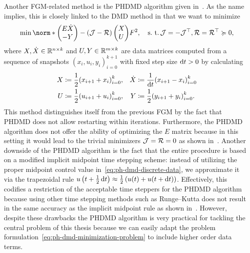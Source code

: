 Another \ac{FGM}-related method is the \ac{PHDMD} algorithm given in~\cite{Morandin2023}.
As the name implies, this is closely linked to the \ac{DMD} method in that we want to minimize
\begin{equation}\label{eq:ph-dmd-minimization-problem}
    \min \norm*{\begin{pmatrix}
        E \dot{X} \\
        -Y
    \end{pmatrix} - (\mcl{J} - \mcl{R}) \begin{pmatrix}
        X \\
        U
    \end{pmatrix}}{F}^2,\quad \suchthat \mcl{J} = - \mcl{J}\trans, \mcl{R} = \mcl{R}\trans \succcurlyeq 0,
\end{equation}
where $X, \dot{X} \in \mathbb{R}^{n \times k}$ and $U, Y \in \mathbb{R}^{m \times k}$ are data matrices computed from a sequence of snapshots ${(x_i, u_i, y_i)}_{i = 0}^{k + 1}$ with fixed step size $\mathop{}\!\mathrm{d} t > 0$ by calculating
\begin{equation}\label{eq:ph-dmd-discrete-data}
    \begin{alignedat}{3}
        X &\coloneqq \frac{1}{2} {\left( x_{i + 1} + x_i \right)}_{i = 0}^k,\quad &\dot{X} &\coloneqq \frac{1}{\mathop{}\!\mathrm{d} t} {\left( x_{i + 1} - x_i \right)}_{i = 0}^k \\
        U &\coloneqq \frac{1}{2} {\left( u_{i + 1} + u_i \right)}_{i = 0}^k,\quad &Y &\coloneqq \frac{1}{2} {\left( y_{i + 1} + y_i \right)}_{i = 0}^k.
    \end{alignedat}
\end{equation}
This method distinguishes itself from the previous \ac{FGM} by the fact that \ac{PHDMD} does not allow restarting within iterations.
Furthermore, the \ac{PHDMD} algorithm does not offer the ability of optimizing the $E$ matrix because in this setting it would lead to the trivial minimizers $\mathcal{J} = \mathcal{R} = 0$ as shown in~\cite[Remark~3.3]{Morandin2023}.
Another downside of the \ac{PHDMD} algorithm is the fact that the entire procedure is based on a modified implicit midpoint time stepping scheme: instead of utilizing the proper midpoint control value in~\eqref{eq:ph-dmd-discrete-data}, we approximate it via the trapezoidal rule $u\left( t + \frac{1}{2} \mathop{}\!\mathrm{d} t \right) \approx \frac{1}{2} \left( u(t) + u(t + \mathop{}\!\mathrm{d} t) \right)$.
Effectively, this codifies a restriction of the acceptable time steppers for the \ac{PHDMD} algorithm because using other time stepping methods such as Runge--Kutta does not result in the same accuracy as the implicit midpoint rule as shown in~\cite[Section~4.1]{Morandin2023}.
However, despite these drawbacks the \ac{PHDMD} algorithm is very practical for tackling the central problem of this thesis because we can easily adapt the problem formulation~\eqref{eq:ph-dmd-minimization-problem} to include higher order data terms.

